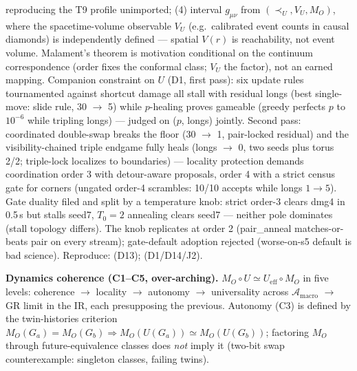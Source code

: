 \documentclass[11pt]{article}
\begin{document}
reproducing the T9 profile unimported; (4) interval $g_{\mu\nu}$ from
$(\prec_U, V_U, M_O)$, where the spacetime-volume observable $V_U$
(e.g.\ calibrated event counts in causal diamonds) is independently
defined --- spatial $V(r)$ is reachability, not event volume. Malament's
theorem is motivation conditional on the continuum correspondence (order
fixes the conformal class; $V_U$ the factor), not an earned mapping.
Companion constraint on $U$ (D1, first pass): six update rules
tournamented against shortcut damage all stall with residual longs
(best single-move: slide rule, 30 $\to$ 5) while $p$-healing proves gameable
(greedy perfects $p$ to $10^{-6}$ while tripling longs) --- judged on
($p$, longs) jointly. Second pass: coordinated double-swap breaks the
floor (30 $\to$ 1, pair-locked residual) and the visibility-chained
triple endgame fully heals (longs $\to$ 0, two seeds plus torus 2/2;
triple-lock localizes to boundaries) --- locality protection
demands coordination order 3 with detour-aware proposals, order 4
with a strict census gate for corners (ungated order-4 scrambles:
10/10 accepts while longs $1{\to}5$). Gate duality filed and split
by a temperature knob: strict order-3 clears dmg4 in 0.5\,s but
stalls seed7, $T_0{=}2$ annealing clears seed7 --- neither pole
dominates (stall topology differs). The knob replicates at order 2
(pair\_anneal matches-or-beats pair on every stream); gate-default
adoption rejected (worse-on-s5 default is bad science).
Reproduce:  (D13);
 (D1/D14/J2).

\textbf{Dynamics coherence (C1--C5, over-arching).} $M_O \circ U \simeq
U_{\mathrm{eff}} \circ M_O$ in five levels: coherence $\to$ locality
$\to$ autonomy $\to$ universality across $\mathcal{A}_{\mathrm{macro}}$
$\to$ GR limit in the IR, each presupposing the previous. Autonomy (C3)
is defined by the twin-histories criterion
$M_O(G_a) = M_O(G_b) \Rightarrow M_O(U(G_a)) \simeq M_O(U(G_b))$;
factoring $M_O$ through future-equivalence classes does \emph{not} imply
it (two-bit swap counterexample: singleton classes, failing twins).
\end{document}
